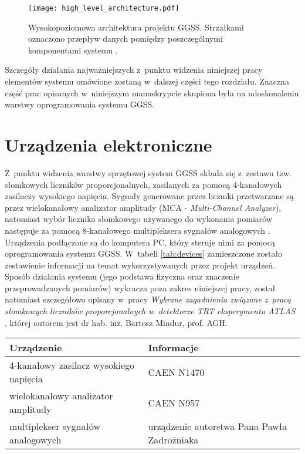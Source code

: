 \begin{figure}[H]
\centering
\texttt{[image: high\_level\_architecture.pdf]}
\caption{Wysokopoziomowa architektura projektu GGSS. Strzałkami oznaczono przepływ danych pomiędzy poszczególnymi komponentami systemu \cite{GGSS_inz}.}
\label{fig:high_level_architecture}
\end{figure}


Szczegóły działania najważniejszych z~punktu widzenia niniejszej pracy elementów systemu omówione zostaną w~dalszej części tego rozdziału. Znaczna część prac opisanych w~niniejszym manuskrypcie skupiona była na udoskonaleniu warstwy oprogramowania systemu GGSS.


\section{Urządzenia elektroniczne}
Z~punktu widzenia warstwy sprzętowej system GGSS składa się z~zestawu tzw. słomkowych liczników proporcjonalnych, zasilanych za pomocą 4-kanałowych zasilaczy wysokiego napięcia. Sygnały generowane przez liczniki przetwarzane są przez wielokanałowy analizator amplitudy (MCA - \emph{Multi-Channel Analyzer}), natomiast wybór licznika słomkowego używanego do wykonania pomiarów następuje za pomocą 8-kanałowego multipleksera sygnałów analogowych \cite{ZadrozniakInz} \cite{ZadrozniakMgr}. Urządzenia podłączone są do komputera PC, który steruje nimi za pomocą oprogramowania systemu GGSS. W~tabeli \ref{tab:devices} zamieszczone zostało zestawienie informacji na temat wykorzystywanych przez projekt urządzeń. Sposób działania systemu (jego podstawa fizyczna oraz znaczenie przeprowadzanych pomiarów) wykracza poza zakres niniejszej pracy, został natomiast szczegółowo opisany w~pracy \emph{Wybrane zagadnienia związane z~pracą słomkowych liczników proporcjonalnych w~detektorze TRT eksperymentu ATLAS} \cite{mindur_phd}, której autorem jest dr hab. inż. Bartosz Mindur, prof. AGH.

\clearpage

\begin{table*}[htbp]
\centering
\caption{Zestawienie istotnych z~punktu widzenia niniejszej pracy urządzeń wchodzących w~skład systemu GGSS.}
\label{tab:devices}
\begin{tabularx}{\textwidth}{@{}XX@{}}
\toprule
Urządzenie &
Informacje \\
\midrule
4-kanałowy zasilacz wysokiego napięcia & CAEN N1470 \cite{caen} \\
wielokanałowy analizator amplitudy & CAEN N957 \cite{caen} \\
multiplekser sygnałów analogowych & urządzenie autorstwa Pana Pawła Zadrożniaka\\
\bottomrule
\end{tabularx}
\end{table*}


